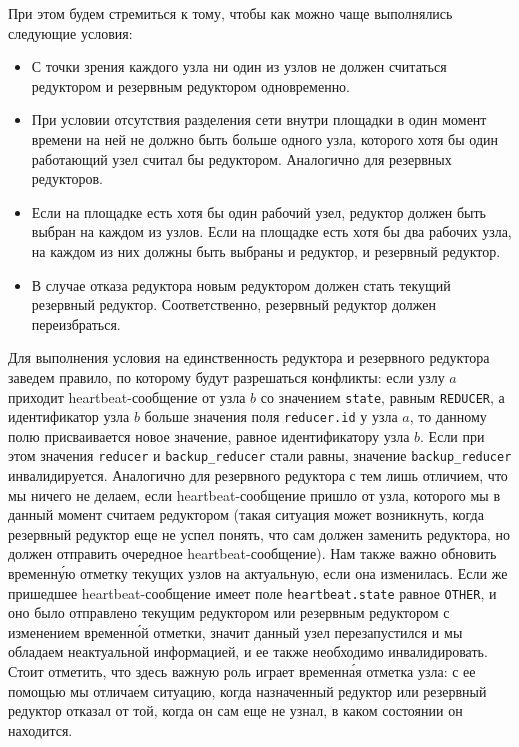 При этом будем стремиться к тому, чтобы как можно чаще выполнялись следующие условия:

\begin{itemize}
    \item С точки зрения каждого узла ни один из узлов не должен считаться редуктором и резервным редуктором одновременно.

    \item При условии отсутствия разделения сети \cite[с.~2]{CAP_Theorem} внутри площадки в один момент времени на ней не должно быть больше одного узла, которого хотя бы один работающий узел считал бы редуктором. Аналогично для резервных редукторов.
    
    \item Если на площадке есть хотя бы один рабочий узел, редуктор должен быть выбран на каждом из узлов. Если на площадке есть хотя бы два рабочих узла, на каждом из них должны быть выбраны и редуктор, и резервный редуктор.
    
    \item В случае отказа редуктора новым редуктором должен стать текущий резервный редуктор. Соответственно, резервный редуктор должен переизбраться.
\end{itemize}

Для выполнения условия на единственность редуктора и резервного редуктора заведем правило, по которому будут разрешаться конфликты: если узлу $a$ приходит heartbeat-со\-об\-ще\-ние от узла $b$ со значением \texttt{state}, равным \texttt{REDUCER}, а идентификатор узла $b$ больше значения поля \texttt{reducer.id} у узла $a$, то данному полю присваивается новое значение, равное идентификатору узла $b$. Если при этом значения \texttt{reducer} и \texttt{backup\_reducer} стали равны, значение \texttt{backup\_reducer} инвалидируется. Аналогично для резервного редуктора с тем лишь отличием, что мы ничего не делаем, если heartbeat-со\-об\-ще\-ние пришло от узла, которого мы в данный момент считаем редуктором (такая ситуация может возникнуть, когда резервный редуктор еще не успел понять, что сам должен заменить редуктора, но должен отправить очередное heartbeat-со\-об\-ще\-ние). Нам также важно обновить временн\'{у}ю отметку текущих узлов на актуальную, если она изменилась. Если же пришедшее heartbeat-со\-об\-ще\-ние имеет поле \texttt{heartbeat.state} равное \texttt{OTHER}, и оно было отправлено текущим редуктором или резервным редуктором с изменением временн\'{о}й отметки, значит данный узел перезапустился и мы обладаем неактуальной информацией, и ее также необходимо инвалидировать. Стоит отметить, что здесь важную роль играет временн\'{а}я отметка узла: с ее помощью мы отличаем ситуацию, когда назначенный редуктор или резервный редуктор отказал от той, когда он сам еще не узнал, в каком состоянии он находится.

